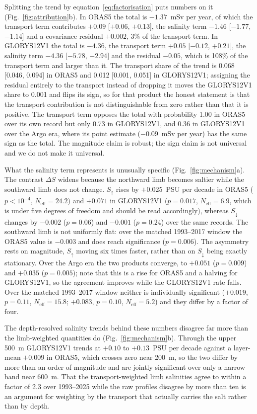 Splitting the trend by equation~\eqref{eq:factorisation} puts numbers on it
(Fig.~\ref{fig:attribution}b). In ORAS5 the total is $-1.37$~mSv per year, of
which the transport term contributes $+0.09$ [$+0.06$, $+0.13$], the salinity
term $-1.46$ [$-1.77$, $-1.14$] and a covariance residual $+0.002$, 3\% of the
transport term. In GLORYS12V1 the total is $-4.36$, the transport term $+0.05$
[$-0.12$, $+0.21$], the salinity term $-4.36$ [$-5.78$, $-2.94$] and the
residual $-0.05$, which is 108\% of the transport term and larger than it. The
transport share of the trend is 0.068 [0.046, 0.094] in ORAS5 and 0.012
[0.001, 0.051] in GLORYS12V1; assigning the residual entirely to the transport
instead of dropping it moves the GLORYS12V1 share to 0.001 and flips its sign, so for that product the honest statement is that the transport
contribution is not distinguishable from zero rather than that it is
positive. The transport term opposes the total with probability 1.00 in ORAS5
over its own record but only 0.73 in GLORYS12V1, and 0.36 in GLORYS12V1 over
the Argo era, where its point estimate ($-0.09$~mSv per year) has the same sign
as the total. The magnitude claim is robust; the sign claim is not universal
and we do not make it universal.

What the salinity term represents is unusually specific
(Fig.~\ref{fig:mechanism}a). The contrast $\Delta S$ widens because the
northward limb becomes saltier while the southward limb does not change.
$S_{\uparrow}$ rises by $+0.025$~PSU per decade in ORAS5 ($p<10^{-4}$,
$N_{\text{eff}}=24.2$) and $+0.071$ in GLORYS12V1 ($p=0.017$,
$N_{\text{eff}}=6.9$, which is under five degrees of freedom and should be read
accordingly), whereas $S_{\downarrow}$ changes by $-0.002$ ($p=0.06$) and
$-0.001$ ($p=0.24$) over the same records. The southward limb is not
uniformly flat: over the matched 1993--2017 window the ORAS5 value is
$-0.003$ and does reach significance ($p=0.006$). The asymmetry rests on
magnitude, $S_{\uparrow}$ moving six times faster, rather than on
$S_{\downarrow}$ being exactly stationary. Over the Argo era the two products converge, to $+0.051$
($p=0.009$) and $+0.035$ ($p=0.005$); note that this is a rise for ORAS5 and a
halving for GLORYS12V1, so the agreement improves while the GLORYS12V1 rate
falls. Over the matched 1993--2017 window neither is individually significant
($+0.019$, $p=0.11$, $N_{\text{eff}}=15.8$; $+0.083$, $p=0.10$,
$N_{\text{eff}}=5.2$) and they differ by a factor of four.

The depth-resolved salinity trends behind these numbers disagree far more than
the limb-weighted quantities do (Fig.~\ref{fig:mechanism}b). Through the upper
500~m GLORYS12V1 trends at $+0.10$ to $+0.13$~PSU per decade against a
layer-mean $+0.009$ in ORAS5, which crosses zero near 200~m, so the two differ
by more than an order of magnitude and are jointly significant over only a
narrow band near 600~m. That the transport-weighted limb
salinities agree to within a factor of 2.3 over 1993--2025 while the raw profiles
disagree by more than ten is an argument for weighting by the transport that
actually carries the salt rather than by depth.

